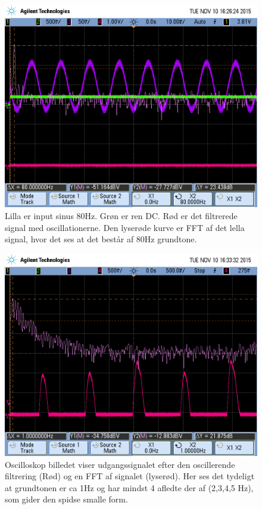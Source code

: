 \begin{figure}[H]
	\includegraphics[width=\textwidth]{billeder/scope_8.png}
	\caption{Lilla er input sinus 80Hz. Grøn er ren DC. Rød er det 	filtrerede signal med oscillationerne. Den lyserøde kurve er FFT af det lella signal, hvor det ses at det består af 80Hz grundtone.}\label{fig:filtertwo}
\end{figure}
\newpage

\begin{figure}[H]
	\includegraphics[width=\textwidth]{billeder/scope_10.png}
	\caption{Oscilloskop billedet viser udgangssignalet efter den oscillerende 	filtrering (Rød) og en FFT af signalet (lyserød). Her ses det tydeligt at grundtonen er ca 1Hz og har mindst 4 afledte der af 	(2,3,4,5 Hz), som gider den spidse smalle form.}\label{fig:filterthree}
\end{figure}


